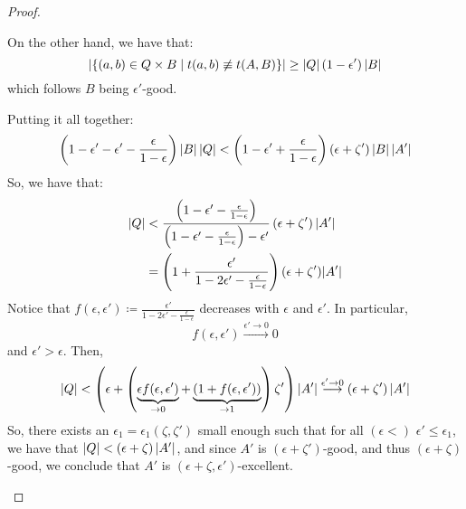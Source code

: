 \begin{lemma}[Claim 5.13]
\begin{proof}
\begin{enumerate}[label=(\alph*), ref=\alph*]
                On the other hand, we have that:
                \[
                    \left| \left\{ (a,b) \in Q \times B \mid t(a, b) \not\equiv t(A, B) \right\} \right| \geq
                    \left| Q \right| \left( 1 - \epsilon' \right) \left| B \right|
                \]
                which follows $B$ being $\epsilon'$-good.

                Putting it all together:
                \[
                    \left( 1 - \epsilon' - \epsilon' - \frac{\epsilon}{1 - \epsilon} \right) \left| B \right| \left| Q \right| <
                    \left( 1 - \epsilon' + \frac{\epsilon}{1 - \epsilon} \right) \left( \epsilon + \zeta' \right) \left| B \right| \left| A' \right|
                \]
                So, we have that:
                \begin{align*}
                    \left| Q \right| & < \frac{\left( 1 - \epsilon' - \frac{\epsilon}{1 - \epsilon} \right)}
                                        {\left( 1 - \epsilon' - \frac{\epsilon}{1 - \epsilon} \right) - \epsilon'}
                                        \left( \epsilon + \zeta' \right) \left| A' \right| \\
                                    & = \left( 1 + \frac{\epsilon'}{1 - 2\epsilon' - \frac{\epsilon}{1 - \epsilon}} \right)
                                        (\epsilon + \zeta') |A'|
                \end{align*}
                Notice that $f(\epsilon, \epsilon') \coloneq \frac{\epsilon'}{1 - 2\epsilon' - \frac{\epsilon}{1 - \epsilon}}$
                decreases with $\epsilon$ and $\epsilon'$.
                In particular,
                \[
                    f(\epsilon, \epsilon') \overset{\epsilon' \to 0}{\longrightarrow} 0
                \]
                and $\epsilon' > \epsilon$.
                Then,
                \[
                    \left| Q \right| < \left( \epsilon + \left( \underbrace{\epsilon f(\epsilon, \epsilon')}_{\to 0} +
                    \underbrace{\left( 1 + f(\epsilon, \epsilon') \right)}_{\to 1} \right) \zeta' \right) |A'|
                    \overset{\epsilon' \to 0}{\longrightarrow} \left( \epsilon + \zeta' \right) |A'|
                \]
                So, there exists an $\epsilon_1 = \epsilon_1(\zeta, \zeta')$ small enough such that for all
                $(\epsilon <)$ $\epsilon' \leq \epsilon_1$, we have that $\left| Q \right| < \left( \epsilon + \zeta \right) |A'|$,
                and since $A'$ is $(\epsilon + \zeta')$-good, and thus $(\epsilon + \zeta)$-good, we conclude that
                $A'$ is $(\epsilon + \zeta, \epsilon')$-excellent. 

\end{enumerate}
\end{proof}
\end{lemma}
